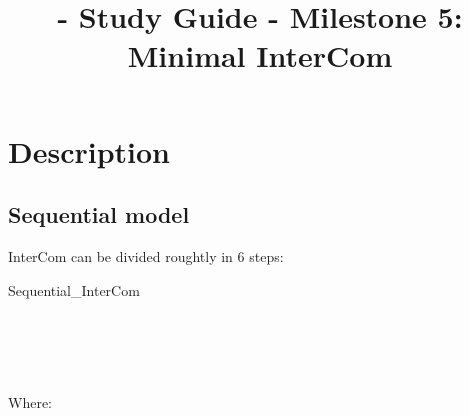 
\title{\TM{} - Study Guide - Milestone 5: Minimal InterCom}

\maketitle

\section{Description}

\subsection{Sequential model}

InterCom can be divided roughtly in 6 steps:

\begin{pseudocode}{Sequential\_InterCom}{~}
  \BEGIN
     \GETS {}\\
     \GETS {}\\
    \\
     \GETS {}\\
     \GETS {}\\
  \END
  \ENDPROCEDURE
\end{pseudocode}

Where:

